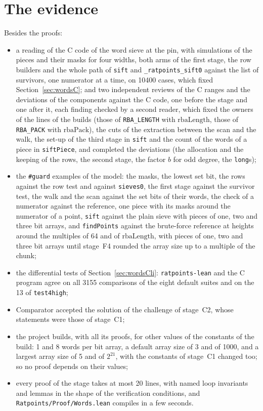 \section{The evidence}\label{sec:words-evidence}

Besides the proofs:
\begin{itemize}
  \item a reading of the C code of the word sieve at the pin, with simulations of the pieces and
    their masks for four widths, both arms of the first stage, the row builders and the whole path
    of \verb|sift| and \verb|_ratpoints_sift0| against the list of survivors, one numerator at a
    time, on 10400 cases, which fixed Section~\ref{sec:wordsC}; and two independent reviews of the
    C ranges and the deviations of the components against the C code, one before the stage and one
    after it, each finding checked by a second reader, which fixed the owners of the lines of the
    builds (those of \verb|RBA_LENGTH| with $\mathrm{rbaLength}$, those of \verb|RBA_PACK| with
    $\mathrm{rbaPack}$), the cuts of the extraction between the scan and the walk, the set-up of
    the third stage in \verb|sift| and the count of the words of a piece in \verb|siftPiece|, and
    completed the deviations (the allocation and the keeping of the rows, the second stage, the
    factor $b$ for odd degree, the \verb|long|s);
  \item the \verb|#guard| examples of the model: the masks, the lowest set bit, the rows against
    the row test and against \verb|sieves0|, the first stage against the survivor test, the walk
    and the scan against the set bits of their words, the check of a numerator against the
    reference, one piece with its masks around the numerator of a point, \verb|sift| against the
    plain sieve with pieces of one, two and three bit arrays, and \verb|findPoints| against the
    brute-force reference at heights around the multiples of 64 and of $\mathrm{rbaLength}$, with
    pieces of one, two and three bit arrays until stage~F4 rounded the array size up to a multiple
    of the chunk;
  \item the differential tests of Section~\ref{sec:wordsCli}: \verb|ratpoints-lean| and the C
    program agree on all 3155 comparisons of the eight default suites and on the 13 of
    \verb|test4high|;
  \item Comparator accepted the solution of the challenge of stage~C2, whose statements were those
    of stage~C1;
  \item the project builds, with all its proofs, for other values of the constants of the build: 1
    and 8 words per bit array, a default array size of 3 and of 1000, and a largest array size of 5
    and of $2^{21}$, with the constants of stage~C1 changed too; so no proof depends on their
    values;
  \item every proof of the stage takes at most 20 lines, with named loop invariants and lemmas in
    the shape of the verification conditions, and \verb|Ratpoints/Proof/Words.lean| compiles in a
    few seconds.
\end{itemize}
